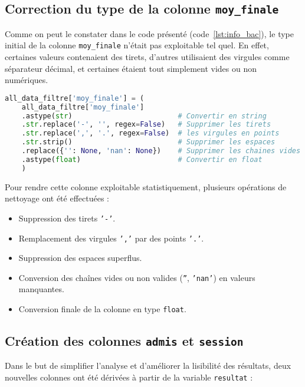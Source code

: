 \subsection{Correction du type de la colonne \texttt{moy\_finale}}

Comme on peut le constater dans le code présenté (code~\ref{lst:info_bac}), le type initial de la colonne \texttt{moy\_finale} n'était pas exploitable tel quel. 
En effet, certaines valeurs contenaient des tirets, d'autres utilisaient des virgules comme séparateur décimal, et certaines étaient tout simplement vides ou non numériques.

\begin{lstlisting}[language=Python,
    caption=Correction du type de la colonne moy\_finale,
    label=lst:moy_finale_type,
    basicstyle=\ttfamily\small,
    backgroundcolor=\color{gray!10}
]
 all_data_filtre['moy_finale'] = (
    all_data_filtre['moy_finale']
    .astype(str)                         # Convertir en string
    .str.replace('-', '', regex=False)   # Supprimer les tirets
    .str.replace(',', '.', regex=False)  # les virgules en points
    .str.strip()                         # Supprimer les espaces
    .replace({'': None, 'nan': None})    # Supprimer les chaines vides
    .astype(float)                       # Convertir en float
    )
\end{lstlisting}

Pour rendre cette colonne exploitable statistiquement, plusieurs opérations de nettoyage ont été effectuées :
\begin{itemize}
\item Suppression des tirets \texttt{'-'}.
\item Remplacement des virgules \texttt{','} par des points \texttt{'.'}.
\item Suppression des espaces superflus.
\item Conversion des chaînes vides ou non valides (\texttt{''}, \texttt{'nan'}) en valeurs manquantes.
\item Conversion finale de la colonne en type \texttt{float}.
\end{itemize}

\subsection{Création des colonnes \texttt{admis} et \texttt{session}}

Dans le but de simplifier l’analyse et d’améliorer la lisibilité des résultats, deux nouvelles colonnes ont été dérivées à partir de la variable \texttt{resultat} :

